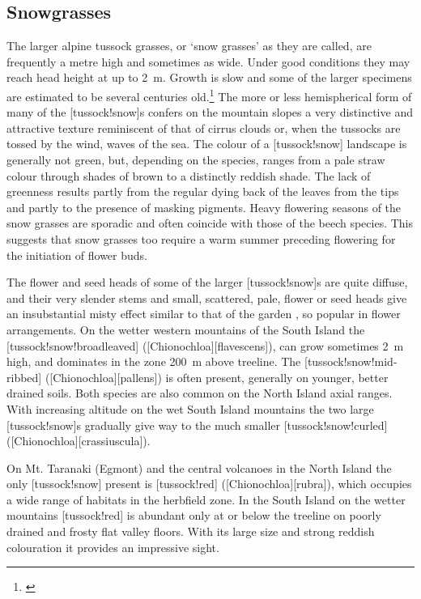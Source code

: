 \subsection{Snowgrasses}

The larger alpine tussock grasses, or `snow grasses' as they are called, are frequently a metre high and sometimes as wide.
Under good conditions they may reach head height at up to \SI{2}{\metre}.
Growth is slow and some of the larger specimens are estimated to be several centuries old.\footnote{\cite{mark1974snow}}
The more or less hemispherical form of many of the [tussock!snow]s confers on the mountain slopes a very distinctive and attractive texture reminiscent of that of cirrus clouds or, when the tussocks are tossed by the wind, waves of the sea.
The colour of a [tussock!snow] landscape is generally not green, but, depending on the species, ranges from a pale straw colour through shades of brown to a distinctly reddish shade.
The lack of greenness results partly from the regular dying back of the leaves from the tips and partly to the presence of masking pigments.
Heavy flowering seasons of the snow grasses are sporadic and often coincide with those of the beech species.
This suggests that snow grasses too require a warm summer preceding flowering for the initiation of flower buds.

The flower and seed heads of some of the larger [tussock!snow]s are quite diffuse, and their very slender stems and small, scattered, pale, flower or seed heads give an insubstantial misty effect similar to that of the garden , so popular in flower arrangements.
On the wetter western mountains of the South Island the [tussock!snow!broadleaved] ([Chionochloa][flavescens]), can grow sometimes \SI{2}{\metre} high, and dominates in the zone \SI{200}{\metre} above treeline.
The [tussock!snow!mid-ribbed] ([Chionochloa][pallens]) is often present, generally on younger, better drained soils.
Both species are also common on the North Island axial ranges.
With increasing altitude on the wet South Island mountains the two large [tussock!snow]s gradually give way to the much smaller [tussock!snow!curled] ([Chionochloa][crassiuscula]).

On Mt. Taranaki (Egmont) and the central volcanoes in the North Island the only [tussock!snow] present is [tussock!red] ([Chionochloa][rubra]), which occupies a wide range of habitats in the herbfield zone.
In the South Island on the wetter mountains [tussock!red] is abundant only at or below the treeline on poorly drained and frosty flat valley floors.
With its large size and strong reddish colouration it provides an impressive sight.

